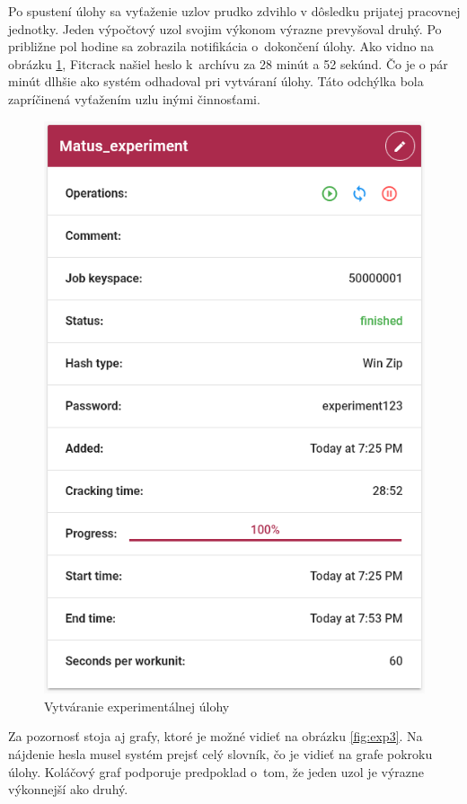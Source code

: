 \documentclass[zadani,slovak]{fitthesis}
\begin{document}
\noindent
Po spustení úlohy sa vyťaženie uzlov prudko zdvihlo v dôsledku prijatej pracovnej jednotky. Jeden výpočtový uzol svojim výkonom výrazne prevyšoval druhý. Po približne pol hodine sa zobrazila notifikácia o~dokončení úlohy. Ako vidno na obrázku \ref{fig:exp2}, Fitcrack našiel heslo k~archívu za 28 minút a 52 sekúnd. Čo je o pár minút dlhšie ako systém odhadoval pri vytváraní úlohy. Táto odchýlka bola zapríčinená vyťažením uzlu inými činnosťami. 
\begin{figure}[H]
    \centering
    \includegraphics[scale=0.6]{obrazky/exp2.PNG}
    \caption{Vytváranie experimentálnej úlohy}
    \label{fig:exp2}
\end{figure}
\noindent
Za pozornosť stoja aj grafy, ktoré je možné vidieť na obrázku \ref{fig:exp3}. Na nájdenie hesla musel systém prejsť celý slovník, čo je vidieť na grafe pokroku úlohy. Koláčový graf podporuje predpoklad o~tom, že jeden uzol je výrazne výkonnejší ako druhý. 
\end{document}
